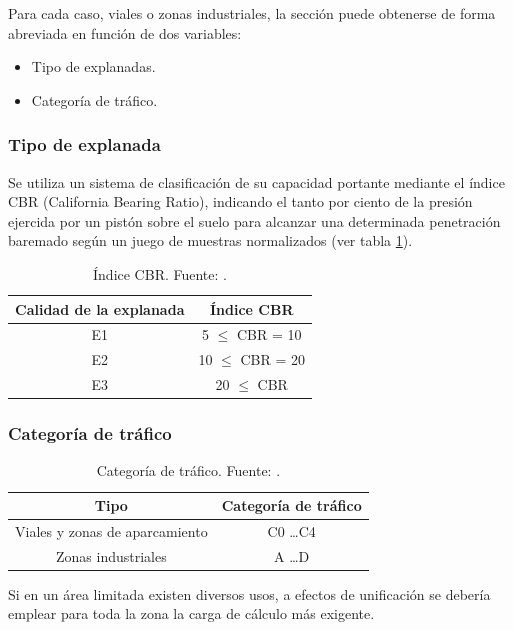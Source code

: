 Para cada caso, viales o zonas industriales, la sección puede obtenerse de forma abreviada en función de dos variables:
\begin{itemize}
\item Tipo de explanadas.
\item Categoría de tráfico.
\end{itemize}

\subsubsection{Tipo de explanada}

Se utiliza un sistema de clasificación de su capacidad portante mediante el índice CBR (California Bearing Ratio), indicando el tanto por ciento de la presión ejercida por un pistón sobre el suelo para alcanzar una determinada penetración baremado según un juego de muestras normalizados (ver tabla \ref{indicecbr}).

\begin{table}[!htb]
\centering
\begin{tabular}{cc}
\toprule
Calidad de la explanada & Índice CBR\\
\midrule
E1 & 5 $\leq$ CBR = 10\\
E2 & 10 $\leq$ CBR = 20\\
E3 & 20 $\leq$ CBR\\
\bottomrule
\end{tabular}
\caption[Índice CBR.]{Índice CBR. Fuente: \protect\cite{euroadoquinc}.}
\label{indicecbr}
\end{table}


\subsubsection{Categoría de tráfico}

\begin{table}[!htb]
\centering
\begin{tabular}{cc}
\toprule
Tipo & Categoría de tráfico\\
\midrule
Viales y zonas de aparcamiento & C0 \ldots C4\\
Zonas industriales & A \ldots D\\
\bottomrule
\end{tabular}
\caption[Categoría de tráfico.]{Categoría de tráfico. Fuente: \protect\cite{euroadoquinc}.}
\label{categoriadetrafico}
\end{table}

Si en un área limitada existen diversos usos, a efectos de unificación se debería emplear para toda la zona la carga de cálculo más exigente.

